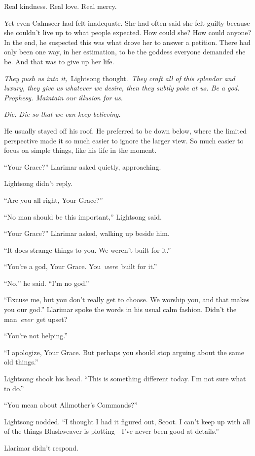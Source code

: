 Real kindness. Real love. Real mercy.

Yet even Calmseer had felt inadequate. She had often said she felt guilty because she couldn’t live up to what people expected. How could she? How could anyone? In the end, he suspected this was what drove her to answer a petition. There had only been one way, in her estimation, to be the goddess everyone demanded she be. And that was to give up her life.

\textit{They push us into it,}~Lightsong thought.~\textit{They craft all of this splendor and luxury, they give us whatever we desire, then they subtly poke at us. Be a god. Prophesy. Maintain our illusion for us.}

\textit{Die. Die so that we can keep believing.}

He usually stayed off his roof. He preferred to be down below, where the limited perspective made it so much easier to ignore the larger view. So much easier to focus on simple things, like his life in the moment.

“Your Grace?” Llarimar asked quietly, approaching.

Lightsong didn’t reply.

“Are you all right, Your Grace?”

“No man should be this important,” Lightsong said.

“Your Grace?” Llarimar asked, walking up beside him.

“It does strange things to you. We weren’t built for it.”

“You’re a god, Your Grace. You~\textit{were}~built for it.”

“No,” he said. “I’m no god.”

“Excuse me, but you don’t really get to choose. We worship you, and that makes you our god.” Llarimar spoke the words in his usual calm fashion. Didn’t the man~\textit{ever}~get upset?

“You’re not helping.”

“I apologize, Your Grace. But perhaps you should stop arguing about the same old things.”

Lightsong shook his head. “This is something different today. I’m not sure what to do.”

“You mean about Allmother’s Commands?”

Lightsong nodded. “I thought I had it figured out, Scoot. I can’t keep up with all of the things Blushweaver is plotting—I’ve never been good at details.”

Llarimar didn’t respond.

